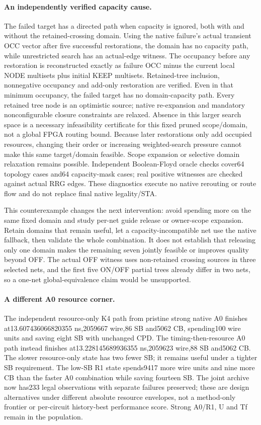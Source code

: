\paragraph{An independently verified capacity cause.}
The failed target has a directed path when capacity is ignored, both with and without the retained-crossing domain. Using the native failure's actual transient OCC vector after five successful restorations, the domain has no capacity path, while unrestricted search has an actual-edge witness. The occupancy before any restoration is reconstructed exactly as failure OCC minus the current local NODE multisets plus initial KEEP multisets. Retained-tree inclusion, nonnegative occupancy and add-only restoration are verified. Even in that minimum occupancy, the failed target has no domain-capacity path. Every retained tree node is an optimistic source; native re-expansion and mandatory nonconfigurable closure constraints are relaxed. Absence in this larger search space is a necessary infeasibility certificate for this fixed pruned scope/domain, not a global FPGA routing bound. Because later restorations only add occupied resources, changing their order or increasing weighted-search pressure cannot make this same target/domain feasible. Scope expansion or selective domain relaxation remains possible. Independent Boolean-Floyd oracle checks cover64 topology cases and64 capacity-mask cases; real positive witnesses are checked against actual RRG edges. These diagnostics execute no native rerouting or route flow and do not replace final native legality/STA.

This counterexample changes the next intervention: avoid spending more on the same fixed domain and study per-net guide release or owner-scope expansion. Retain domains that remain useful, let a capacity-incompatible net use the native fallback, then validate the whole combination. It does not establish that releasing only one domain makes the remaining seven jointly feasible or improves quality beyond OFF. The actual OFF witness uses non-retained crossing sources in three selected nets, and the first five ON/OFF partial trees already differ in two nets, so a one-net global-equivalence claim would be unsupported.

\paragraph{A different A0 resource corner.}
The independent resource-only K4 path from pristine strong native A0 finishes at13.607436066820355 ns,2059667 wire,86 SB and5062 CB, spending100 wire units and saving eight SB with unchanged CPD. The timing-then-resource A0 path instead finishes at13.228145689936355 ns,2059623 wire,88 SB and5062 CB. The slower resource-only state has two fewer SB; it remains useful under a tighter SB requirement. The low-SB R1 state spends9417 more wire units and nine more CB than the faster A0 combination while saving fourteen SB. The joint archive now has233 legal observations with separate failures preserved; these are design alternatives under different absolute resource envelopes, not a method-only frontier or per-circuit history-best performance score. Strong A0/R1, U and Tf remain in the population.

